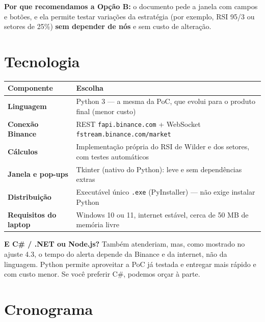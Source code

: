 \documentclass[11pt,a4paper]{article}
\begin{document}
\begin{tcolorbox}[goldbox]
  \small\textbf{Por que recomendamos a Opção B:} o documento pede a janela com campos e botões, e ela
  permite testar variações da estratégia (por exemplo, RSI 95/3 ou setores de 25\%) \textbf{sem
  depender de nós} e sem custo de alteração.
\end{tcolorbox}

\section{Tecnologia}

\begin{center}
\small
\renewcommand{\arraystretch}{1.3}
\begin{tabularx}{\textwidth}{@{}>{\bfseries}p{40mm} X@{}}
  \toprule
  \rowcolor{navy!8}
  \textbf{Componente} & \textbf{Escolha} \\
  \midrule
  Linguagem          & Python 3 --- a mesma da PoC, que evolui para o produto final (menor custo) \\
  Conexão Binance    & REST \texttt{fapi.binance.com} + WebSocket \texttt{fstream.binance.com/market} \\
  Cálculos           & Implementação própria do RSI de Wilder e dos setores, com testes automáticos \\
  Janela e pop-ups   & Tkinter (nativo do Python): leve e sem dependências extras \\
  Distribuição       & Executável único \texttt{.exe} (PyInstaller) --- não exige instalar Python \\
  Requisitos do laptop & Windows 10 ou 11, internet estável, cerca de 50 MB de memória livre \\
  \bottomrule
\end{tabularx}
\end{center}

\textbf{E C\# / .NET ou Node.js?} Também atenderiam, mas, como mostrado no ajuste 4.3, o tempo do
alerta depende da Binance e da internet, não da linguagem. Python permite aproveitar a PoC já
testada e entregar mais rápido e com custo menor. Se você preferir C\#, podemos orçar à parte.

\section{Cronograma}
\end{document}

